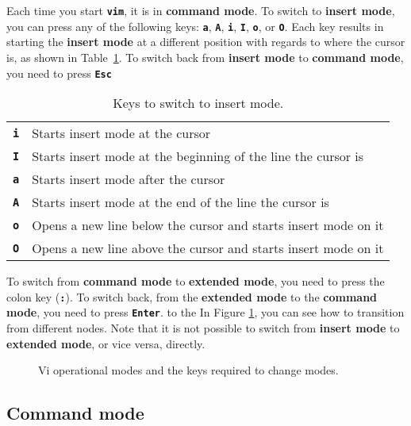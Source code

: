 Each time you start \textbf{\texttt{vim}}, it is in \textbf{command mode}. To switch to \textbf{insert mode}, you can press any of the following keys: \textbf{\texttt{a}}, \textbf{\texttt{A}}, \textbf{\texttt{i}}, \textbf{\texttt{I}}, \textbf{\texttt{o}}, or \textbf{\texttt{O}}. Each key results in starting the \textbf{insert mode} at a different position with regards to where the cursor is, as shown in Table~\ref{tab:insert_keys}. To switch back from \textbf{insert mode} to \textbf{command mode}, you need to press \textbf{\texttt{Esc}}

\begin{table}[!htbp]
   \myfloatalign
   \begin{tabularx}{\textwidth}{Xp{110mm}} \toprule
     \textbf{\texttt{i}} & Starts insert mode at the cursor \\
     \textbf{\texttt{I}} & Starts insert mode at the beginning of the line the cursor is \\
     \textbf{\texttt{a}} & Starts insert mode after the cursor \\
      \textbf{\texttt{A}} & Starts insert mode at the end of the line the cursor is \\
     \textbf{\texttt{o}} & Opens a new line below the cursor and starts insert mode on it \\
     \textbf{\texttt{O}} & Opens a new line above the cursor and starts insert mode on it \\
   \bottomrule
   \end{tabularx}
\caption{Keys to switch to insert mode.}
\label{tab:insert_keys}
\end{table}

To switch from \textbf{command mode} to \textbf{extended mode}, you need to press the colon key (\textbf{\texttt{:}}). To switch back, from the \textbf{extended mode} to the \textbf{command mode}, you need to press \textbf{\texttt{Enter}}. to the In Figure \ref{fig:ch5_vim_modes}, you can see how to transition from different nodes. Note that it is not possible to switch from \textbf{insert mode} to \textbf{extended mode}, or vice versa, directly.

\begin{figure}[!htbp]
  \centering
        
        \caption{Vi operational modes and the keys required to change modes.}
        \label{fig:ch5_vim_modes}
\end{figure}

\subsection*{Command mode}

